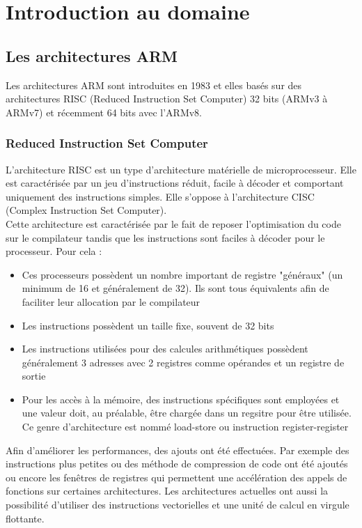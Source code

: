 \chapter{Introduction au domaine}

\section{ Les architectures ARM }

Les architectures ARM sont introduites en 1983 et elles basés sur des architectures RISC (Reduced Instruction Set Computer) 32 bits (ARMv3 à ARMv7) et récemment 64 bits avec l'ARMv8.

\subsection{ Reduced Instruction Set Computer }

L'architecture RISC est un type d'architecture matérielle de microprocesseur. Elle est caractérisée par un jeu d'instructions réduit, facile à décoder et comportant uniquement des instructions simples. Elle s'oppose à l'architecture CISC (Complex Instruction Set Computer).
\\
Cette architecture est caractérisée par le fait de reposer l'optimisation du code sur le compilateur tandis que les instructions sont faciles à décoder pour le processeur. Pour cela :
\begin{itemize}
\item Ces processeurs possèdent un nombre important de registre "généraux" (un minimum de 16 et généralement de 32). Ils sont tous équivalents afin de faciliter leur allocation par le compilateur
\item Les instructions possèdent un taille fixe, souvent de 32 bits
\item Les instructions utilisées pour des calcules arithmétiques possèdent généralement 3 adresses avec 2 registres comme opérandes et un registre de sortie
\item Pour les accès à la mémoire, des instructions spécifiques sont employées et une valeur doit, au préalable, être chargée dans un regsitre pour être utilisée. Ce genre d'architecture est nommé load-store ou instruction register-register
\end{itemize}
Afin d'améliorer les performances, des ajouts ont été effectuées. Par exemple des instructions plus petites ou des méthode de compression de code ont été ajoutés ou encore les fenêtres de registres qui permettent une accélération des appels de fonctions sur certaines architectures.
Les architectures actuelles ont aussi la possibilité d'utiliser des instructions vectorielles et une unité de calcul en virgule flottante. 

